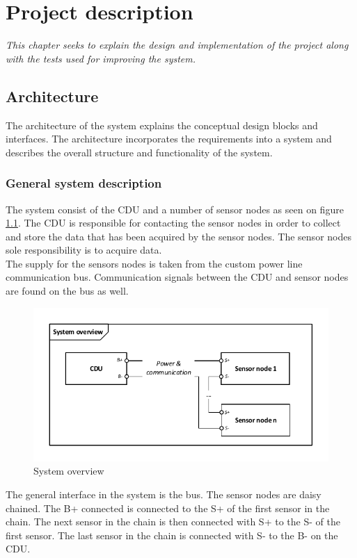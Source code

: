\chapter{Project description}
\textit{This chapter seeks to explain the design and implementation of the project along with the tests used for improving the system.}
\section{Architecture}
The architecture of the system explains the conceptual design blocks and interfaces. The architecture incorporates the requirements into a system and describes the overall structure and functionality of the system. 

\subsection{General system description}
The system consist of the CDU and a number of sensor nodes as seen on figure \ref{fig:systembdd}. The CDU is responsible for contacting the sensor nodes in order to collect and store the data that has been acquired by the sensor nodes. The sensor nodes sole responsibility is to acquire data.\\
The supply for the sensors nodes is taken from the custom power line communication bus. Communication signals between the CDU and sensor nodes are found on the bus as well. 
\begin{figure}[H]
	\centering
	\includegraphics[width=.9\textwidth]{billeder/11ProjectDescription/systembdd}
	\caption{System overview}
	\label{fig:systembdd}
\end{figure}
The general interface in the system is the bus. The sensor nodes are daisy chained. The B+ connected is connected to the S+ of the first sensor in the chain. The next sensor in the chain is then connected with S+ to the S- of the first sensor. The last sensor in the chain is connected with S- to the B- on the CDU.\\
